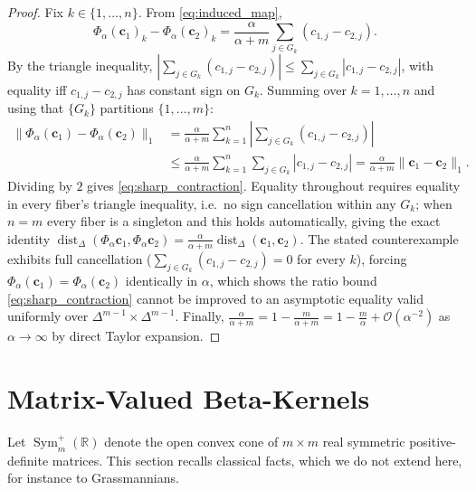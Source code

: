 \documentclass[11pt,a4paper]{article}
\theoremstyle{plain}
\theoremstyle{definition}
\theoremstyle{remark}
\numberwithin{equation}{section}
\begin{document}
\begin{proof}
Fix $k \in \{1,\dots,n\}$. From \eqref{eq:induced_map},
\begin{equation}
\Phi_\alpha(\mathbf{c}_1)_k - \Phi_\alpha(\mathbf{c}_2)_k = \frac{\alpha}{\alpha+m} \sum_{j \in G_k} (c_{1,j} - c_{2,j}).
\end{equation}
By the triangle inequality, $\left|\sum_{j \in G_k}(c_{1,j}-c_{2,j})\right| \le \sum_{j\in G_k}|c_{1,j}-c_{2,j}|$, with equality iff $c_{1,j}-c_{2,j}$ has constant sign on $G_k$. Summing over $k=1,\dots,n$ and using that $\{G_k\}$ partitions $\{1,\dots,m\}$:
\begin{equation}
\begin{aligned}
\|\Phi_\alpha(\mathbf{c}_1) - \Phi_\alpha(\mathbf{c}_2)\|_1 &= \frac{\alpha}{\alpha+m}\sum_{k=1}^n \left|\sum_{j\in G_k}(c_{1,j}-c_{2,j})\right| \\ &\le \frac{\alpha}{\alpha+m}\sum_{k=1}^n \sum_{j\in G_k}|c_{1,j}-c_{2,j}| = \frac{\alpha}{\alpha+m}\|\mathbf{c}_1-\mathbf{c}_2\|_1.
\end{aligned}
\end{equation}
Dividing by $2$ gives \eqref{eq:sharp_contraction}. Equality throughout requires equality in every fiber's triangle inequality, i.e.\ no sign cancellation within any $G_k$; when $n=m$ every fiber is a singleton and this holds automatically, giving the exact identity $\operatorname{dist}_\Delta(\Phi_\alpha\mathbf{c}_1,\Phi_\alpha\mathbf{c}_2) = \frac{\alpha}{\alpha+m}\operatorname{dist}_\Delta(\mathbf{c}_1,\mathbf{c}_2)$. The stated counterexample exhibits full cancellation ($\sum_{j\in G_k}(c_{1,j}-c_{2,j})=0$ for every $k$), forcing $\Phi_\alpha(\mathbf{c}_1)=\Phi_\alpha(\mathbf{c}_2)$ identically in $\alpha$, which shows the ratio bound \eqref{eq:sharp_contraction} cannot be improved to an asymptotic equality valid uniformly over $\Delta^{m-1}\times\Delta^{m-1}$. Finally, $\frac{\alpha}{\alpha+m} = 1 - \frac{m}{\alpha+m} = 1-\frac{m}{\alpha}+\mathcal{O}(\alpha^{-2})$ as $\alpha\to\infty$ by direct Taylor expansion.
\end{proof}

\section{Matrix-Valued Beta-Kernels}

Let $\operatorname{Sym}_m^+(\mathbb{R})$ denote the open convex cone of $m \times m$ real symmetric positive-definite matrices. This section recalls classical facts, which we do not extend here, for instance to Grassmannians.
\end{document}

